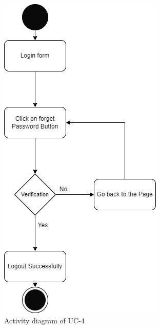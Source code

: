 \begin{figure}[H]
    \centering
    \includegraphics[scale=0.5]{./diagrams/Activity Diagram/ad-04.png}
    \caption{Activity diagram of UC-4}
    \label{fig:act-04}

\end{figure}



